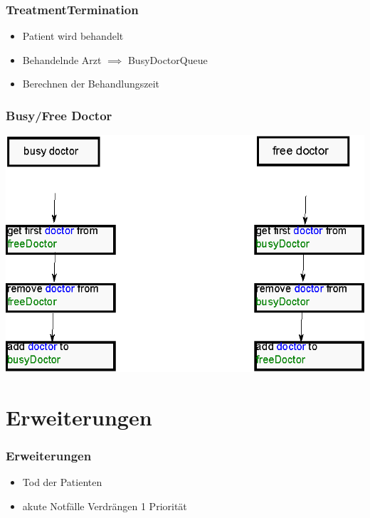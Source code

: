 \documentclass{beamer}
\begin{document}
\begin{frame}
	\frametitle{TreatmentTermination}
	\begin{itemize}
		\item Patient wird behandelt
		\item Behandelnde Arzt $\implies$ BusyDoctorQueue
		\item Berechnen der Behandlungszeit
	\end{itemize}
\end{frame}

\begin{frame}
	\frametitle{Busy/Free Doctor}
	\begin{center}
		\includegraphics[scale=1]{img/freeDoctor.eps}
	\end{center}
	
\end{frame}

%
\section{Erweiterungen}
%
%
\begin{frame}
	\frametitle{Erweiterungen}
	\begin{itemize}
		\item Tod der Patienten
		\item akute Notf\"{a}lle Verdr\"{a}ngen 1 Priorit\"{a}t
	\end{itemize}
\end{frame}

\begin{frame}
\end{frame}

\begin{frame}
\end{frame}
\end{document}
